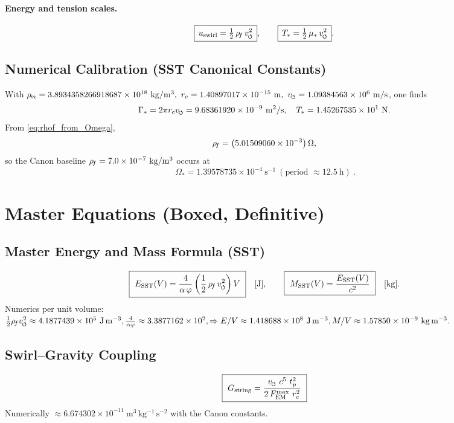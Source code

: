\documentclass[11pt]{article}
\begin{document}
    \paragraph{Energy and tension scales.}
    \[
        \boxed{\, u_{\text{swirl}}=\tfrac12\,\rhof\,\vscore^2 \,},\qquad
        \boxed{\, T_\ast = \tfrac12\,\mu_\ast\,\vscore^2 \,}.
    \]

    \subsection{Numerical Calibration (SST Canonical Constants)}
    With
    \(
    \rhom=3.8934358266918687\times10^{18}\ \mathrm{kg/m^3},\
    \rc=1.40897017\times10^{-15}\ \mathrm{m},\
    \vscore=1.09384563\times10^{6}\ \mathrm{m/s}
    \),
    one finds
    \[
        \Gamma_\ast = 2\pi \rc \vscore
        = 9.68361920\times10^{-9}\ \mathrm{m^2/s},\quad
        T_\ast = 1.45267535\times10^{1}\ \mathrm{N}.
    \]
    From \eqref{eq:rhof_from_Omega},
    \[
        \rho_{\!f} = \bigl(5.01509060\times10^{-3}\bigr)\,\Omega,
    \]
    so the Canon baseline \( \rhof=7.0\times10^{-7}\ \mathrm{kg/m^3}\) occurs at
    \[
        \boxed{\ \Omega_\ast = 1.39578735\times10^{-4}\ \mathrm{s^{-1}}\ (\text{period } \approx 12.5\ \mathrm{h})\ }.
    \]

    \section{Master Equations (Boxed, Definitive)}

    \subsection{Master Energy and Mass Formula (SST)}
    \[
        \boxed{\ E_{\text{SST}}(V) = \frac{4}{\alpha\,\varphi} \left( \frac{1}{2}\,\rhof\,\vscore^{2} \right) V\ }\quad [\text{J}],
        \qquad
        \boxed{\ M_{\text{SST}}(V) = \frac{E_{\text{SST}}(V)}{c^{2}} \ }\quad [\text{kg}].
    \]
    Numerics per unit volume:
    \(
    \tfrac12\rhof \vscore^2 \approx 4.1877439\times10^{5}\ \mathrm{J\,m^{-3}},
    \frac{4}{\alpha\varphi} \approx 3.3877162\times10^{2},
    \Rightarrow E/V \approx 1.418688\times10^{8}\ \mathrm{J\,m^{-3}},
    M/V \approx 1.57850\times10^{-9}\ \mathrm{kg\,m^{-3}}.
    \)

    \subsection{Swirl–Gravity Coupling}
    \[
        \boxed{\ G_{\text{string}} = \frac{\vscore\ c^{5}\ t_p^{2}}{2\,F_{\text{EM}}^{\max}\ \rc^{2}} \ }
    \]
    Numerically \( \approx 6.674302\times10^{-11}\ \mathrm{m^3\,kg^{-1}\,s^{-2}}\) with the Canon constants.
\end{document}
